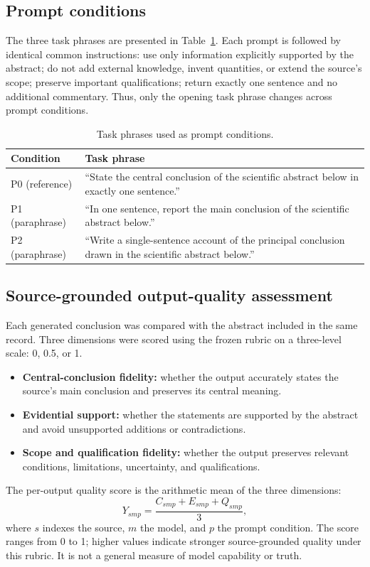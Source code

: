 \documentclass[acmsmall,screen,nonacm]{acmart}
\begin{document}
\subsection{Prompt conditions}
The three task phrases are presented in Table~\ref{tab:prompts}. Each prompt is followed by identical common instructions: use only information explicitly supported by the abstract; do not add external knowledge, invent quantities, or extend the source's scope; preserve important qualifications; return exactly one sentence and no additional commentary. Thus, only the opening task phrase changes across prompt conditions.

\begin{table}[t]
\caption{Task phrases used as prompt conditions.}
\label{tab:prompts}
\small
\begin{tabularx}{\linewidth}{@{}lX@{}}
\toprule
Condition & Task phrase \\
\midrule
P0 (reference) & ``State the central conclusion of the scientific abstract below in exactly one sentence.'' \\
P1 (paraphrase) & ``In one sentence, report the main conclusion of the scientific abstract below.'' \\
P2 (paraphrase) & ``Write a single-sentence account of the principal conclusion drawn in the scientific abstract below.'' \\
\bottomrule
\end{tabularx}
\end{table}

\subsection{Source-grounded output-quality assessment}
Each generated conclusion was compared with the abstract included in the same record. Three dimensions were scored using the frozen rubric on a three-level scale: 0, 0.5, or 1.
\begin{itemize}[leftmargin=*]
  \item \textbf{Central-conclusion fidelity:} whether the output accurately states the source's main conclusion and preserves its central meaning.
  \item \textbf{Evidential support:} whether the statements are supported by the abstract and avoid unsupported additions or contradictions.
  \item \textbf{Scope and qualification fidelity:} whether the output preserves relevant conditions, limitations, uncertainty, and qualifications.
\end{itemize}
The per-output quality score is the arithmetic mean of the three dimensions:
\begin{equation}
Y_{smp}=\frac{C_{smp}+E_{smp}+Q_{smp}}{3},
\label{eq:quality}
\end{equation}
where $s$ indexes the source, $m$ the model, and $p$ the prompt condition. The score ranges from 0 to 1; higher values indicate stronger source-grounded quality under this rubric. It is not a general measure of model capability or truth.
\end{document}
